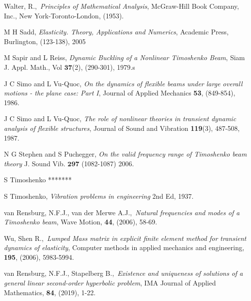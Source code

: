 \documentclass[main.tex]{subfiles}
\begin{document}
\begin{thebibliography}{AAA}
 Walter, R.,\ \textit{Principles of Mathematical Analysis}, McGraw-Hill Book Company, Inc., New York-Toronto-London, (1953).

 M H Sadd, {\it Elasticity. Theory, Applications and Numerics}, Academic Press, Burlington, (123-138), 2005

 M Sapir and L Reiss, {\it Dynamic Buckling of a
Nonlinear Timoshenko Beam}, Siam J. Appl. Math., Vol
$\mathbf{37}$(2), (290-301), 1979.s

 J C Simo and L Vu-Quoc, {\it On the dynamics of
flexible beams under large overall motions - the plane case: Part
I}, Journal of Applied Mechanics {\bf 53}, (849-854), 1986.

 J C Simo and L Vu-Quoc, {\it The role of
nonlinear theories in transient dynamic analysis of flexible
structures}, Journal of Sound and Vibration {\bf 119}(3), 487-508,
1987.

 N G Stephen and S Puchegger, {\it On the valid frequency
range of Timoshenko beam theory} J. Sound Vib. $\mathbf{297}$
(1082-1087) 2006.

 S Timoshenko *******

 S Timoshenko, {\it Vibration problems in engineering}
2nd Ed, 1937.

 van Rensburg, N.F.J., van der Merwe A.J.,\ \textit{Natural frequencies and modes of a Timoshenko beam}, Wave Motion, \textbf{44}, (2006), 58-69.

 Wu, Shen R.,\ \textit{Lumped Mass matrix in explicit finite element method for transient dynamics of elasticity}, Computer methods in applied mechanics and engineering, \textbf{195}, (2006), 5983-5994.

 van Rensburg, N.F.J., Stapelberg B.,\ \textit{Existence and uniqueness of solutions of a general linear second-order hyperbolic problem}, IMA Journal of Applied Mathematics, \textbf{84}, (2019), 1-22.

\end{thebibliography}
\end{document}
